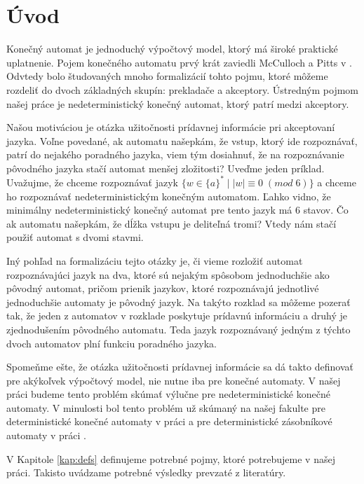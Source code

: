 \chapter*{Úvod}

Konečný automat je jednoduchý výpočtový model, ktorý má široké praktické uplatnenie. Pojem konečného automatu prvý krát zaviedli McCulloch a Pitts v \cite{McCullochPitts}. Odvtedy bolo študovaných mnoho formalizácií tohto pojmu, ktoré môžeme rozdeliť do dvoch základných skupín: prekladače a akceptory. Ústredným pojmom našej práce je nedeterministický konečný automat, ktorý patrí medzi akceptory.
\par
Našou motiváciou je otázka užitočnosti prídavnej informácie pri akceptovaní jazyka. Voľne povedané, ak automatu našepkám, že vstup, ktorý ide rozpoznávať, patrí do nejakého poradného jazyka, viem tým dosiahnuť, že na rozpoznávanie pôvodného jazyka stačí automat menšej zložitosti? Uveďme jeden príklad. Uvažujme, že chceme rozpoznávať jazyk $ \lbrace w \in \lbrace a \rbrace^* \; | \; |w| \equiv 0 \; (mod \; 6) \rbrace $ a chceme ho rozpoznávať nedeterministickým konečným automatom. Ľahko vidno, že minimálny nedeterministický konečný automat pre tento jazyk má 6 stavov. Čo ak automatu našepkám, že dĺžka vstupu je deliteľná tromi? Vtedy nám stačí použiť automat s dvomi stavmi.
\par
Iný pohľad na formalizáciu tejto otázky je, či vieme rozložiť automat rozpoznávajúci jazyk na dva, ktoré sú nejakým spôsobom jednoduchšie ako pôvodný automat, pričom prienik jazykov, ktoré rozpoznávajú jednotlivé jednoduchšie automaty je pôvodný jazyk. Na takýto rozklad sa môžeme pozerať tak, že jeden z automatov v rozklade poskytuje prídavnú informáciu a druhý je zjednodušením pôvodného automatu. Teda jazyk rozpoznávaný jedným z týchto dvoch automatov plní funkciu poradného jazyka.
\par
Spomeňme ešte, že otázka užitočnosti prídavnej informácie sa dá takto definovať pre akýkoľvek výpočtový model, nie nutne iba pre konečné automaty. V našej práci budeme tento problém skúmať výlučne pre nedeterministické konečné automaty. V minulosti bol tento problém už skúmaný na našej fakulte pre deterministické konečné automaty v práci \cite{Gazi} a pre deterministické zásobníkové automaty v práci \cite{Labath}.
\par
V Kapitole \ref{kap:defs} definujeme potrebné pojmy, ktoré potrebujeme v našej práci. Takisto uvádzame potrebné výsledky prevzaté z literatúry.
\par
